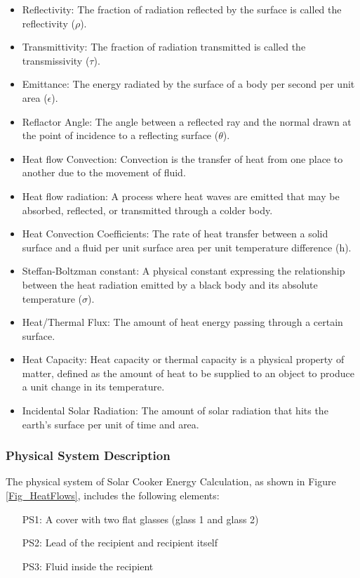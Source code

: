 \documentclass[12pt]{article}
\begin{document}
\begin{itemize}

\item Reflectivity: The fraction of radiation reflected by the surface is called the reflectivity ($\rho$). 
\item Transmittivity: The fraction of radiation transmitted is called the transmissivity ($\tau$).
\item Emittance: The energy radiated by the surface of a body per second per unit area ($\epsilon$).
\item Reflactor Angle: The angle between a reflected ray and the normal drawn at the point of incidence to a reflecting surface ($\theta$).
\item Heat flow Convection: Convection is the transfer of heat from one place to another due to the movement of fluid. 
\item Heat flow radiation: A process where heat waves are emitted that may be absorbed, reflected, or transmitted through a colder body.
\item Heat Convection Coefficients: The rate of heat transfer between a solid surface and a fluid per unit surface area per unit temperature difference (h). 
\item Steffan-Boltzman constant: A physical constant expressing the relationship between the heat radiation emitted by a black body and its absolute temperature ($\sigma$).
\item Heat/Thermal Flux: The amount of heat energy passing through a certain surface.
\item Heat Capacity: Heat capacity or thermal capacity is a physical property of matter, defined as the amount of heat to be supplied to an object to produce a unit change in its temperature. 
\item Incidental Solar Radiation: The amount of solar radiation that hits the earth’s surface per unit of time and area. 


\end{itemize}

\subsubsection{Physical System Description} \label{sec_phySystDescrip}

The physical system of Solar Cooker
Energy Calculation, as shown in Figure \ref{Fig_HeatFlows},
includes the following elements:


\begin{itemize}

\item[PS1:] A cover with two flat glasses (glass 1 and glass 2) 

\item[PS2:] Lead of the recipient and recipient itself

\item[PS3:] Fluid inside the recipient

\end{itemize}
\end{document}
